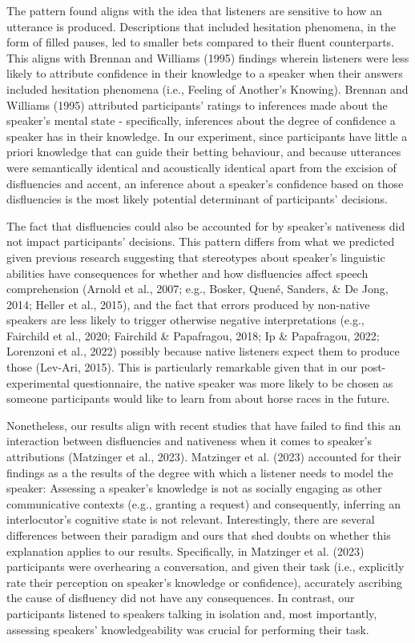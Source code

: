 \documentclass[
  man,floatsintext]{apa7}
\begin{document}
The pattern found aligns with the idea that listeners are sensitive to how an utterance is produced. Descriptions that included hesitation phenomena, in the form of filled pauses, led to smaller bets compared to their fluent counterparts. This aligns with Brennan and Williams (1995) findings wherein listeners were less likely to attribute confidence in their knowledge to a speaker when their answers included hesitation phenomena (i.e., Feeling of Another's Knowing). Brennan and Williams (1995) attributed participants' ratings to inferences made about the speaker's mental state - specifically, inferences about the degree of confidence a speaker has in their knowledge. In our experiment, since participants have little a priori knowledge that can guide their betting behaviour, and because utterances were semantically identical and acoustically identical apart from the excision of disfluencies and accent, an inference about a speaker's confidence based on those disfluencies is the most likely potential determinant of participants' decisions.

The fact that disfluencies could also be accounted for by speaker's nativeness did not impact participants' decisions. This pattern differs from what we predicted given previous research suggesting that stereotypes about speaker's linguistic abilities have consequences for whether and how disfluencies affect speech comprehension (Arnold et al., 2007; e.g., Bosker, Quené, Sanders, \& De Jong, 2014; Heller et al., 2015), and the fact that errors produced by non-native speakers are less likely to trigger otherwise negative interpretations (e.g., Fairchild et al., 2020; Fairchild \& Papafragou, 2018; Ip \& Papafragou, 2022; Lorenzoni et al., 2022) possibly because native listeners expect them to produce those (Lev-Ari, 2015). This is particularly remarkable given that in our post-experimental questionnaire, the native speaker was more likely to be chosen as someone participants would like to learn from about horse races in the future.

Nonetheless, our results align with recent studies that have failed to find this an interaction between disfluencies and nativeness when it comes to speaker's attributions (Matzinger et al., 2023). Matzinger et al. (2023) accounted for their findings as a the results of the degree with which a listener needs to model the speaker: Assessing a speaker's knowledge is not as socially engaging as other communicative contexts (e.g., granting a request) and consequently, inferring an interlocutor's cognitive state is not relevant. Interestingly, there are several differences between their paradigm and ours that shed doubts on whether this explanation applies to our results. Specifically, in Matzinger et al. (2023) participants were overhearing a conversation, and given their task (i.e., explicitly rate their perception on speaker's knowledge or confidence), accurately ascribing the cause of disfluency did not have any consequences. In contrast, our participants listened to speakers talking in isolation and, most importantly, assessing speakers' knowledgeability was crucial for performing their task.
\end{document}
